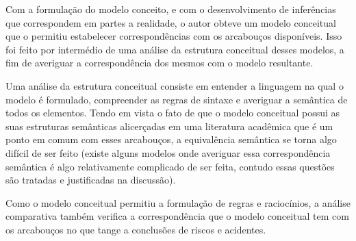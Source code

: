 Com a formulação do modelo conceito, e com o desenvolvimento de inferências que correspondem em partes a realidade, o autor obteve um modelo conceitual que o permitiu estabelecer correspondências com os arcabouços disponíveis. Isso foi feito por intermédio de uma análise da estrutura conceitual desses modelos, a fim de averiguar a correspondência dos mesmos com o modelo resultante.

Uma análise da estrutura conceitual consiste em entender a linguagem na qual o modelo é formulado, compreender as regras de sintaxe e averiguar a semântica de todos os elementos. Tendo em vista o fato de que o modelo conceitual possui as suas estruturas semânticas alicerçadas em uma literatura acadêmica que é um ponto em comum com esses arcabouços, a equivalência semântica se torna algo difícil de ser feito (existe alguns modelos onde averiguar essa correspondência semântica é algo relativamente complicado de ser feita, contudo essas questões são tratadas e justificadas na discussão).

Como o modelo conceitual permitiu a formulação de regras e raciocínios, a análise comparativa também verifica a correspondência que o modelo conceitual tem com os arcabouços no que tange a conclusões de riscos e acidentes.
